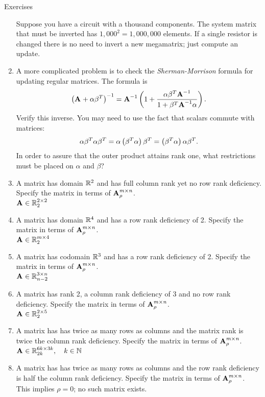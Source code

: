 \begin{xcb}{Exercises}
\begin{enumerate}
Suppose you have a circuit with a thousand components. The system matrix that must be inverted has $1,000^{2}=1,000,000$ elements. If a single resistor is changed there is no need to invert a new megamatrix; just compute an update.
\item A more complicated problem is to check the \textit{Sherman-Morrison} formula for updating regular matrices. The formula is
\begin{equation}
  \left( \textbf{A}^{\mathrm{}}+\alpha \beta^{T} \right)^{-1} = \textbf{A}^{\mathrm{-1}}\left( 1+\frac{\alpha \beta^{T}\textbf{A}^{\mathrm{-1}}}{1+\beta^{T}\textbf{A}^{\mathrm{-1}}\alpha} \right).
\end{equation}
Verify this inverse. You may need to use the fact that scalars commute with matrices:
\begin{equation}
  \alpha \beta^{T}\alpha \beta^{T}=\alpha \left( \beta^{T}\alpha \right) \beta^{T}=\left( \beta^{T}\alpha \right)\alpha \beta^{T}.
\end{equation}
In order to assure that the outer product attains rank one, what restrictions must be placed on $\alpha$ and $\beta$?
\item A matrix has domain $\mathbb{R}^{2}$ and has full column rank yet no row rank deficiency. Specify the matrix in terms of $\textbf{A}^{\mathrm{\mathit{m} \times \mathit{n}}}_{\rho}$.\\
$\textbf{A}^{\mathrm{}}\in\mathbb{R}^{2 \times 2}_{2}$
\item A matrix has domain $\mathbb{R}^{4}$ and has a row rank deficiency of 2. Specify the matrix in terms of $\textbf{A}^{\mathrm{\mathit{m} \times \mathit{n}}}_{\rho}$.\\
$\textbf{A}^{\mathrm{}}\in\mathbb{R}^{m\times 4}_{2}$
\item A matrix has codomain $\mathbb{R}^{3}$ and has a row rank deficiency of 2. Specify the matrix in terms of $\textbf{A}^{\mathrm{\mathit{m} \times \mathit{n}}}_{\rho}$.\\
$\textbf{A}^{\mathrm{}}\in\mathbb{R}^{3\times n}_{n-2}$
\item A matrix has rank 2, a column rank deficiency of 3 and no row rank deficiency. Specify the matrix in terms of $\textbf{A}^{\mathrm{\mathit{m} \times \mathit{n}}}_{\rho}$.\\
$\textbf{A}^{\mathrm{}}\in\mathbb{R}^{2\times 5}_{2}$
\item A matrix has has twice as many rows as columns and the matrix rank is twice the column rank deficiency. Specify the matrix in terms of $\textbf{A}^{\mathrm{\mathit{m} \times \mathit{n}}}_{\rho}$.\\
$\textbf{A}^{\mathrm{}}\in\mathbb{R}^{6k\times 3k}_{2k}, \quad k\in\mathbb{N}$
\item A matrix has has twice as many rows as columns and the row rank deficiency is half the column rank deficiency. Specify the matrix in terms of $\textbf{A}^{\mathrm{\mathit{m} \times \mathit{n}}}_{\rho}$.\\
This implies $\rho=0$; no such matrix exists.

\end{enumerate}
\end{xcb}


\endinput